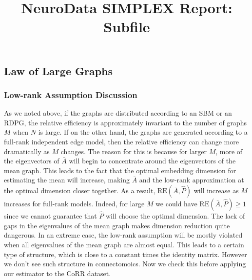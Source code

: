 \documentclass[simplex.tex]{subfiles}
\title{NeuroData SIMPLEX Report: Subfile}
\begin{document}

\subsection{Law of Large Graphs}

\subsubsection{Low-rank Assumption Discussion}
As we noted above, if the graphs are distributed according to an SBM or an RDPG, the relative efficiency is approximately invariant to the number of graphs $M$ when $N$ is large.
If on the other hand, the graphs are generated according to a full-rank independent edge model, then the relative efficiency can change more dramatically as $M$ changes. 
The reason for this is because for larger $M$, more of the eigenvectors of $\bar{A}$ will begin to concentrate around the eigenvectors of the mean graph.
This leads to the fact that the optimal embedding dimension for estimating the mean will increase, making $\bar{A}$ and the low-rank approximation at the optimal dimension closer together. 
As a result, $\mathrm{RE}(\bar{A},\hat{P})$ will increase as $M$ increases for full-rank models.
Indeed, for large $M$ we could have $\mathrm{RE}(\bar{A},\hat{P})\geq 1$ since we cannot guarantee that $\hat{P}$ will choose the optimal dimension.
The lack of gaps in the eigenvalues of the mean graph makes dimension reduction quite dangerous.
In an extreme case, the low-rank assumption will be mostly violated when all eigenvalues of the mean graph are almost equal. This leads to a certain type of structure, which is close to a constant times the identity matrix. However we don't see such structure in connectomoics. Now we check this before applying our estimator to the CoRR dataset.
\end{document}
